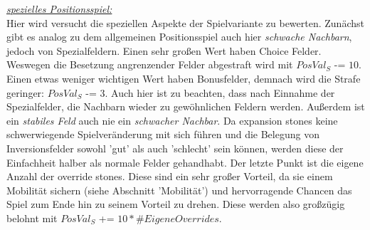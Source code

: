 \underline{\textit{spezielles Positionsspiel:}}\\
Hier wird versucht die speziellen Aspekte der Spielvariante zu bewerten.
Zunächst gibt es analog zu dem allgemeinen Positionsspiel auch hier \textit{schwache Nachbarn}, jedoch von Spezialfeldern. Einen sehr großen Wert haben Choice Felder. Weswegen die Besetzung angrenzender Felder abgestraft wird mit $PosVal_S$ -= $10$. Einen etwas weniger wichtigen Wert haben Bonusfelder, demnach wird die Strafe geringer: $PosVal_S$ -= $3$. Auch hier ist zu beachten, dass nach Einnahme der Spezialfelder, die Nachbarn wieder zu gewöhnlichen Feldern werden. Außerdem ist ein \textit{stabiles Feld} auch nie ein \textit{schwacher Nachbar}.
Da expansion stones keine schwerwiegende Spielveränderung mit sich führen und die Belegung von Inversionsfelder sowohl 'gut' als auch 'schlecht' sein können, werden diese der Einfachheit halber als normale Felder gehandhabt. Der letzte Punkt ist die eigene Anzahl der override stones. Diese sind ein sehr großer Vorteil, da sie einem Mobilität sichern (siehe Abschnitt 'Mobilität') und hervorragende Chancen das Spiel zum Ende hin zu seinem Vorteil zu drehen. Diese werden also großzügig belohnt mit $PosVal_S$ += $10 * \#EigeneOverrides$.\\

